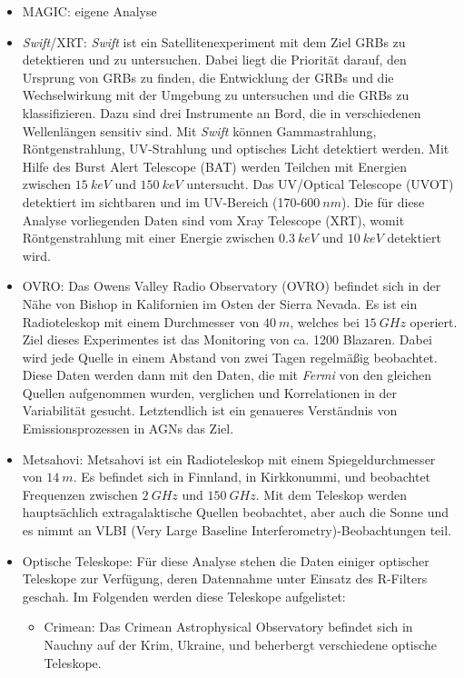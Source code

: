 \begin{itemize}
 \item MAGIC: eigene Analyse
 \item \textit{Swift}/XRT: \textit{Swift} ist ein Satellitenexperiment mit dem Ziel GRBs zu detektieren und zu untersuchen.
  Dabei liegt die Priorität darauf, den Ursprung von GRBs zu finden, die Entwicklung der GRBs und die Wechselwirkung mit der Umgebung zu untersuchen und die GRBs zu klassifizieren.
  Dazu sind drei Instrumente an Bord, die in verschiedenen Wellenlängen sensitiv sind. 
  Mit \textit{Swift} können Gammastrahlung, Röntgenstrahlung, UV-Strahlung und optisches Licht detektiert werden.
  Mit Hilfe des Burst Alert Telescope (BAT) werden Teilchen mit Energien zwischen $\SI{15}{keV}$ und $\SI{150}{keV}$ untersucht.
  Das UV/Optical Telescope (UVOT) detektiert im sichtbaren und im UV-Bereich (170-$\SI{600}{nm}$).
  Die für diese Analyse vorliegenden Daten sind vom Xray Telescope (XRT), womit Röntgenstrahlung mit einer Energie zwischen $\SI{0,3}{keV}$ und $\SI{10}{keV}$ detektiert wird.\cite{Swift}
 \item OVRO: Das Owens Valley Radio Observatory (OVRO) befindet sich in der Nähe von Bishop in Kalifornien im Osten der Sierra Nevada.
  Es ist ein Radioteleskop mit einem Durchmesser von $\SI{40}{m}$, welches bei $\SI{15}{GHz}$ operiert.
  Ziel dieses Experimentes ist das Monitoring von ca. 1200 Blazaren.
  Dabei wird jede Quelle in einem Abstand von zwei Tagen regelmäßig beobachtet.
  Diese Daten werden dann mit den Daten, die mit \textit{Fermi} von den gleichen Quellen aufgenommen wurden, verglichen und Korrelationen in der Variabilität gesucht.
  Letztendlich ist ein genaueres Verständnis von Emissionsprozessen in AGNs das Ziel.\cite{OVRO}
 \item Metsahovi: Metsahovi ist ein Radioteleskop mit einem Spiegeldurchmesser von $\SI{14}{m}$. 
  Es befindet sich in Finnland, in Kirkkonummi, und beobachtet Frequenzen zwischen $\SI{2}{GHz}$ und $\SI{150}{GHz}$.
  Mit dem Teleskop werden hauptsächlich extragalaktische Quellen beobachtet, aber auch die Sonne und es nimmt an VLBI (Very Large Baseline Interferometry)-Beobachtungen teil.\cite{Metsahovi}
 \item Optische Teleskope: Für diese Analyse stehen die Daten einiger optischer Teleskope zur Verfügung, deren Datennahme unter Einsatz des R-Filters geschah.
  Im Folgenden werden diese Teleskope aufgelistet:
 \begin{itemize}
  \item Crimean: Das Crimean Astrophysical Observatory befindet sich in Nauchny auf der Krim, Ukraine, und beherbergt verschiedene optische Teleskope.\cite{Crimean}

\end{itemize}
\end{itemize}
